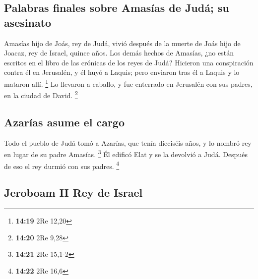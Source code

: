\hypertarget{palabras-finales-sobre-amasuxedas-de-juduxe1-su-asesinato}{%
\subsection{Palabras finales sobre Amasías de Judá; su
asesinato}\label{palabras-finales-sobre-amasuxedas-de-juduxe1-su-asesinato}}

 Amasías hijo de Joás, rey de Judá, vivió después de la
muerte de Joás hijo de Joacaz, rey de Israel, quince años.
 Los demás hechos de Amasías, ¿no están escritos en el
libro de las crónicas de los reyes de Judá?  Hicieron una
conspiración contra él en Jerusalén, y él huyó a Laquis; pero enviaron
tras él a Laquis y lo mataron allí. \footnote{\textbf{14:19} 2Re 12,20}
 Lo llevaron a caballo, y fue enterrado en Jerusalén con
sus padres, en la ciudad de David. \footnote{\textbf{14:20} 2Re 9,28}

\hypertarget{azaruxedas-asume-el-cargo}{%
\subsection{Azarías asume el cargo}\label{azaruxedas-asume-el-cargo}}

 Todo el pueblo de Judá tomó a Azarías, que tenía
dieciséis años, y lo nombró rey en lugar de su padre Amasías.
\footnote{\textbf{14:21} 2Re 15,1-2}  Él edificó Elat y
se la devolvió a Judá. Después de eso el rey durmió con sus padres.
\footnote{\textbf{14:22} 2Re 16,6}

\hypertarget{jeroboam-ii-rey-de-israel}{%
\subsection{Jeroboam II Rey de Israel}\label{jeroboam-ii-rey-de-israel}}

